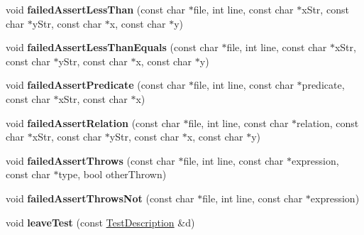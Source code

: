 \begin{DoxyCompactItemize}
\item 
\hypertarget{classCxxTest_1_1TeeListener_aeadb25a20b82a9665831c9fe9324853e}{void {\bfseries failed\-Assert\-Less\-Than} (const char $\ast$file, int line, const char $\ast$x\-Str, const char $\ast$y\-Str, const char $\ast$x, const char $\ast$y)}\label{classCxxTest_1_1TeeListener_aeadb25a20b82a9665831c9fe9324853e}

\item 
\hypertarget{classCxxTest_1_1TeeListener_a2e19e49cb6d70b2cee33fb969106a9cc}{void {\bfseries failed\-Assert\-Less\-Than\-Equals} (const char $\ast$file, int line, const char $\ast$x\-Str, const char $\ast$y\-Str, const char $\ast$x, const char $\ast$y)}\label{classCxxTest_1_1TeeListener_a2e19e49cb6d70b2cee33fb969106a9cc}

\item 
\hypertarget{classCxxTest_1_1TeeListener_a3edf93dca81fece6e4983ddac654f405}{void {\bfseries failed\-Assert\-Predicate} (const char $\ast$file, int line, const char $\ast$predicate, const char $\ast$x\-Str, const char $\ast$x)}\label{classCxxTest_1_1TeeListener_a3edf93dca81fece6e4983ddac654f405}

\item 
\hypertarget{classCxxTest_1_1TeeListener_ab66852c21a72ee5b627802806f5035b9}{void {\bfseries failed\-Assert\-Relation} (const char $\ast$file, int line, const char $\ast$relation, const char $\ast$x\-Str, const char $\ast$y\-Str, const char $\ast$x, const char $\ast$y)}\label{classCxxTest_1_1TeeListener_ab66852c21a72ee5b627802806f5035b9}

\item 
\hypertarget{classCxxTest_1_1TeeListener_ae5afa6bb1fdb86f9cf8bab96350fab56}{void {\bfseries failed\-Assert\-Throws} (const char $\ast$file, int line, const char $\ast$expression, const char $\ast$type, bool other\-Thrown)}\label{classCxxTest_1_1TeeListener_ae5afa6bb1fdb86f9cf8bab96350fab56}

\item 
\hypertarget{classCxxTest_1_1TeeListener_a9f71e3fa8d42fec1b3fb28a800a7ad6f}{void {\bfseries failed\-Assert\-Throws\-Not} (const char $\ast$file, int line, const char $\ast$expression)}\label{classCxxTest_1_1TeeListener_a9f71e3fa8d42fec1b3fb28a800a7ad6f}

\item 
\hypertarget{classCxxTest_1_1TeeListener_ab969f02289bce8276b90f10def738561}{void {\bfseries leave\-Test} (const \hyperlink{classCxxTest_1_1TestDescription}{Test\-Description} \&d)}\label{classCxxTest_1_1TeeListener_ab969f02289bce8276b90f10def738561}


\end{DoxyCompactItemize}
